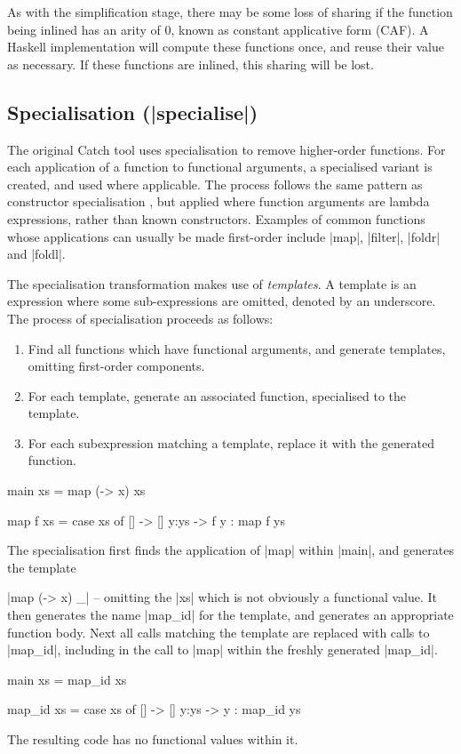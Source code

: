 \documentclass[preprint]{sigplanconf}
\begin{document}
As with the simplification stage, there may be some loss of sharing if the function being inlined has an arity of 0, known as constant applicative form (CAF). A Haskell implementation will compute these functions once, and reuse their value as necessary. If these functions are inlined, this sharing will be lost.

\subsection{Specialisation (|specialise|)}

The original Catch tool \cite{me:catch_tfp} uses specialisation to remove higher-order functions. For each application of a function to functional arguments, a specialised variant is created, and used where applicable. The process follows the same pattern as constructor specialisation \cite{spj:specconstr}, but applied where function arguments are lambda expressions, rather than known constructors. Examples of common functions whose applications can usually be made first-order include |map|, |filter|, |foldr| and |foldl|.

The specialisation transformation makes use of \textit{templates}. A template is an expression where some sub-expressions are omitted, denoted by an underscore. The process of specialisation proceeds as follows:

\begin{enumerate}
\item Find all functions which have functional arguments, and generate templates, omitting first-order components.
\item For each template, generate an associated function, specialised to the template.
\item For each subexpression matching a template, replace it with the generated function.
\end{enumerate}

\begin{example}
\begin{code}
main xs = map (\x -> x) xs

map f xs = case  xs of
                 []    -> []
                 y:ys  -> f y : map f ys
\end{code}

The specialisation first finds the application of |map| within |main|, and generates the template \ignore|map (\x -> x) _| -- omitting the |xs| which is not obviously a functional value. It then generates the name |map_id| for the template, and generates an appropriate function body. Next all calls matching the template are replaced with calls to |map_id|, including in the call to |map| within the freshly generated |map_id|.

\begin{code}
main xs = map_id xs

map_id xs = case  xs of
                  []    -> []
                  y:ys  -> y : map_id ys
\end{code}

The resulting code has no functional values within it.
\end{example}
\end{document}
